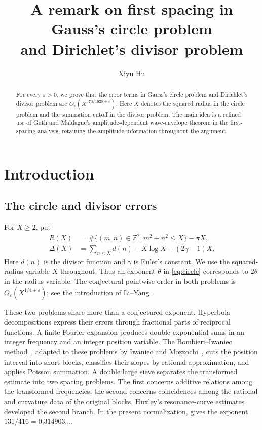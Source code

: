 \documentclass[11pt,reqno]{amsart}
\title[First spacing in the circle and divisor problems]{A remark on first spacing in Gauss's circle problem\texorpdfstring{\\}{ }and Dirichlet's divisor problem}
\author{Xiyu Hu}
\date{}
\numberwithin{equation}{section}
\theoremstyle{definition}
\theoremstyle{remark}
\newcommand{\Z}{\mathbb Z}
\newcommand{\eps}{\varepsilon}
\begin{document}
\begin{abstract}
For every $\eps>0$, we prove that the error terms in Gauss's circle problem
and Dirichlet's divisor problem are $O_\eps(X^{573/1828+\eps})$.
Here $X$ denotes the squared radius in the circle problem and the summation
cutoff in the divisor problem. The main idea is a refined use of Guth and
Maldague's amplitude-dependent wave-envelope theorem in the first-spacing
analysis, retaining the amplitude information throughout the argument.
\end{abstract}
\maketitle
\setcounter{tocdepth}{1}
\tableofcontents

\section{Introduction}\label{sec:intro}
\subsection{The circle and divisor errors}
For $X\ge2$, put
\begin{align}
 R(X)&=\#\{(m,n)\in\Z^2:m^2+n^2\le X\}-\pi X,\label{eq:circle}\\
 \Delta(X)&=\sum_{n\le X}d(n)-X\log X-(2\gamma-1)X.\label{eq:divisor}
\end{align}
Here $d(n)$ is the divisor function and $\gamma$ is Euler's constant.
We use the squared-radius variable $X$ throughout. Thus an exponent $\theta$ in \eqref{eq:circle} corresponds to $2\theta$ in the radius variable.
The conjectural pointwise order in both problems is $O_\eps(X^{1/4+\eps})$; see the introduction of Li--Yang~\cite{LY}.

These two problems share more than a conjectured exponent. Hyperbola decompositions express their errors through fractional parts of reciprocal functions. A finite Fourier expansion produces double exponential sums in an integer frequency and an integer position variable.
The Bombieri--Iwaniec method~\cite{BI}, adapted to these problems by Iwaniec and Mozzochi~\cite{IM}, cuts the position interval into short blocks, classifies their slopes by rational approximation, and applies Poisson summation.
A double large sieve separates the transformed estimate into two spacing problems.
The first concerns additive relations among the transformed frequencies; the second concerns coincidences among the rational and curvature data of the original blocks.
Huxley's resonance-curve estimates~\cite{H90,H93,H03} developed the second branch. In the present normalization, \cite{H03} gives the exponent $131/416=0.314903\ldots$.
\end{document}
